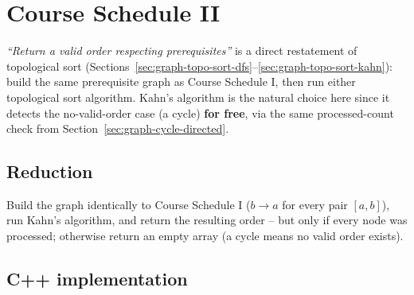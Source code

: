 \section{Course Schedule II}
\label{sec:graph-course-schedule-2}


\begin{patternbox}
\emph{``Return a valid order respecting prerequisites''} is a direct
restatement of topological sort
(Sections~\ref{sec:graph-topo-sort-dfs}--\ref{sec:graph-topo-sort-kahn}):
build the same prerequisite graph as Course Schedule I, then run either
topological sort algorithm. Kahn's algorithm is the natural choice here
since it detects the no-valid-order case (a cycle) \textbf{for free},
via the same processed-count check from Section~\ref{sec:graph-cycle-directed}.
\end{patternbox}

\subsection*{Reduction}

Build the graph identically to Course Schedule I ($b \to a$ for every
pair $[a,b]$), run Kahn's algorithm, and return the resulting order --
but only if every node was processed; otherwise return an empty array
(a cycle means no valid order exists).

\subsection*{C++ implementation}

